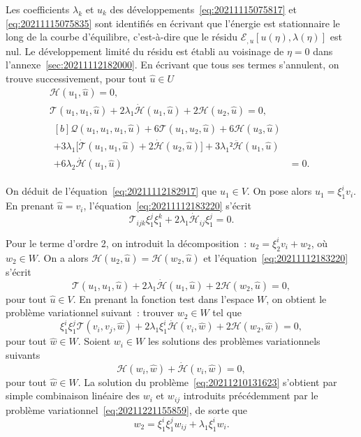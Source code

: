 \documentclass[12pt, final]{amsart}
\begin{document}
Les coefficients \(\lambda_k\) et \(u_k\) des
développements~\eqref{eq:20211115075817} et \eqref{eq:20211115075835} sont
identifiés en écrivant que l'énergie est stationnaire le long de la courbe
d'équilibre, c'est-à-dire que le résidu
\(ℰ_{,u}[u(η), \lambda(η)]\) est nul. Le développement limité du
résidu est établi au voisinage de \(η=0\) dans
l'annexe~\ref{sec:20211112182000}. En écrivant que tous ses termes s'annulent,
on trouve successivement, pour tout \(\hat{u}∈ U\)
\begin{gather}
  \label{eq:20211112182917}
  \mathcal H(u_1, \hat{u})=0,\\
  \label{eq:20211112183220}
  \mathcal T(u_1, u_1, \hat{u})
  +2\lambda_1\dot{\mathcal H}(u_1, \hat{u})
  +2\mathcal H(u_2, \hat{u})=0,\\
  \begin{aligned}[b]
    \mathcal Q(u_1, u_1, u_1, \hat{u})
    +6\mathcal T(u_1, u_2, \hat{u})+6\mathcal H(u_3, \hat{u})&\\
    +3\lambda_1\bigl[\dot{\mathcal T}(u_1, u_1, \hat{u})
    +2\dot{\mathcal H}(u_2, \hat{u})\bigr]
    +3\lambda_1²\ddot{\mathcal H}(u_1, \hat{u})&\\
    +6\lambda_2\dot{\mathcal H}(u_1, \hat{u})&=0.
  \end{aligned}
\end{gather}

On déduit de l'équation~\eqref{eq:20211112182917} que \(u_1∈ V\). On pose
alors \(u_1=ξ_1^i v_i\). En prenant \(\hat{u}=v_i\),
l'équation~\eqref{eq:20211112183220} s'écrit
\begin{equation}
  \mathcal T_{ijk}ξ_1^jξ_1^k+2\lambda_1\dot{\mathcal H}_{ij}ξ_1^j=0.
\end{equation}

Pour le terme d'ordre 2, on introduit la décomposition~:
\(u_2=ξ_2^iv_i+w_2\), où \(w_2∈ W\). On a alors
\(\mathcal H(u_2, \hat{u})=\mathcal H(w_2, \hat{u})\) et
l'équation~\eqref{eq:20211112183220} s'écrit
\begin{equation}
  \mathcal T(u_1, u_1, \hat{u})+2\lambda_1\dot{\mathcal H}(u_1, \hat{u})
  +2\mathcal H(w_2, \hat{u})=0,
\end{equation}
pour tout \(\hat{u}∈ V\). En prenant la fonction test dans l'espace \(W\), on
obtient le problème variationnel suivant~: trouver \(w_2∈ W\) tel
que
\begin{equation}
  \label{eq:20211210131623}
  ξ_1^iξ_1^j\mathcal T(v_i, v_j, \hat{w})
  +2\lambda_1ξ_1^i\dot{\mathcal H}(v_i, \hat{w})
  +2\mathcal H(w_2, \hat{w})=0,
\end{equation}
pour tout \(\hat{w}∈ W\). Soient \(w_i∈ W\) les solutions des problèmes
variationnels suivants
\begin{equation}
  \mathcal H(w_i, \hat{w})+\dot{\mathcal H}(v_i, \hat{w})=0,
\end{equation}
pour tout \(\hat{w}∈ W\). La solution du problème~\eqref{eq:20211210131623}
s'obtient par simple combinaison linéaire des \(w_i\) et \(w_{ij}\) introduits
précédemment par le problème variationnel~\eqref{eq:20211221155859}, de sorte
que
\begin{equation}
  w_2=ξ_1^iξ_1^jw_{ij}+\lambda_1ξ_1^i w_i.
\end{equation}
\end{document}
